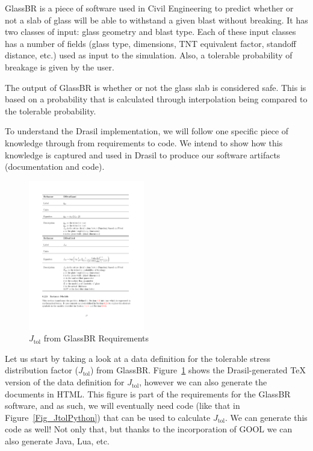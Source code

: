 \documentclass[sigconf]{acmart}
\newcommand{\jtol}{$J_{\mbox{tol}}$}
\begin{document}
GlassBR is a piece of software used in Civil Engineering to predict whether or 
not a slab of glass will be able to withstand a given blast without breaking. It 
has two classes of input: glass geometry and blast type. Each of these input 
classes has a number of fields (glass type, dimensions, TNT equivalent factor, 
standoff distance, etc.) used as input to the simulation. Also, a tolerable 
probability of breakage is given by the user.

The output of GlassBR is whether or not the glass slab is considered safe. This 
is based on a probability that is calculated through interpolation being 
compared to the tolerable probability.

To understand the Drasil implementation, we will follow one specific piece of 
knowledge through from requirements to code. We intend to show how this 
knowledge is captured and used in Drasil to produce our software artifacts 
(documentation and code).



\begin{figure}
\begin{center}
\includegraphics[width=0.45\textwidth]{./figures/Jtol_pdf.pdf}
\end{center}
\caption{\jtol{} from GlassBR Requirements}
\label{Fig_Jtolpdf}
\end{figure}

Let us start by taking a look at a data definition for the tolerable stress 
distribution factor (\jtol{}) from GlassBR. Figure~\ref{Fig_Jtolpdf} 
shows the Drasil-generated TeX version of the data definition for 
\jtol{}, however we can also generate the documents in HTML. This 
figure is part of the requirements for the GlassBR software, and as such, we 
will eventually need code (like that in Figure~\ref{Fig_JtolPython}) that can be 
used to calculate \jtol{}. We can generate this code as well! Not only 
that, but thanks to the incorporation of GOOL we can also generate Java, Lua, 
etc. 
\end{document}
